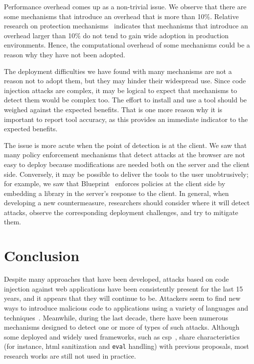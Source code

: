 \documentclass[10pt,journal,compsoc]{IEEEtran}
\begin{document}
Performance overhead comes up as a non-trivial issue. We observe
that there are some mechanisms that introduce an overhead
that is more than 10\%. Relative
research on protection mechanisms~\cite{SPWS13} indicates that
mechanisms that introduce an overhead larger than 10\% do not tend to
gain wide adoption in production environments. Hence, the
computational overhead of some mechanisms could be a reason why they
have not been adopted.

The deployment difficulties we have found with many mechanisms are not
a reason not to adopt them, but they may hinder their widespread use.
Since code injection attacks are complex, it may be logical to
expect that mechanisms to detect them would be complex too. The effort
to install and use a tool should be weighed against the expected
benefits. That is one more reason why it is important to report tool
accuracy, as this provides an immediate indicator to the expected
benefits. 

The issue is more acute when the point of detection is at the client.
We saw that many policy enforcement mechanisms that detect attacks at
the browser are not easy to deploy because modifications are needed
both on the server and the client side.
Conversely, it may be possible to deliver
the tools to the user unobtrusively; for example, we saw that
Blueprint~\cite{LV09} enforces policies at the client side by embedding a library
in the server's response to the client. In general, when developing a
new countermeasure, researchers should consider where it
will detect attacks, observe the corresponding deployment
challenges, and try to mitigate them.

\section{Conclusion}
\label{sec:conclusion}

Despite many approaches that have been developed,
attacks based on code injection against web applications
have been consistently present for the last 15 years,
and it appears that they will continue to be.
Attackers seem to find new ways to introduce
malicious code to applications using a
variety of languages and techniques~\cite{HNSHS12,DKH14}.
Meanwhile, during the last decade, there have been
numerous mechanisms designed to
detect one or more of types of such attacks.
Although some deployed and widely used frameworks, 
such as {\sc csp}~\cite{SSM10},
share characteristics
(for instance, {\sc html} sanitization and {\tt eval} handling)
with previous proposals, 
most research works are still not used in practice.
\end{document}
